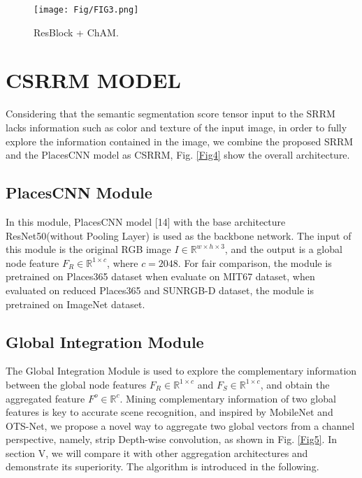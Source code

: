 \documentclass[conference]{IEEEtran}
\begin{document}
\begin{figure}[htbp]
    \centering
    \texttt{[image: Fig/FIG3.png]}
    \caption{ResBlock + ChAM.}
    \label{Fig3}
\end{figure}

\section{CSRRM MODEL}

Considering that the semantic segmentation score tensor input to the SRRM lacks information such as color and texture of the input image, in order to fully explore the information contained in the image, we combine the proposed SRRM and the PlacesCNN model as CSRRM, Fig. \ref{Fig4} show the overall architecture.

\subsection{PlacesCNN Module}

In this module, PlacesCNN model [14] with the base architecture ResNet50\cite{ref14}(without Pooling Layer) is used as the backbone network. The input of this module is the original RGB image $I \in \mathbb{R}^{w \times h \times 3}$, and the output is a global node feature $F_R \in \mathbb{R}^{1 \times c}$, where $c=2048$. For fair comparison, the module is pretrained on Places365 dataset\cite{ref14} when evaluate on MIT67 dataset\cite{ref8}, when evaluated on reduced Places365 and SUNRGB-D\cite{ref30} dataset, the module is pretrained on ImageNet dataset\cite{ref32}.

\subsection{Global Integration Module}

The Global Integration Module is used to explore the complementary information between the global node features $F_R \in \mathbb{R}^{1 \times c}$ and $F_S \in \mathbb{R}^{1 \times c}$, and obtain the aggregated feature $F^o \in \mathbb{R}^c$. Mining complementary information of two global features is key to accurate scene recognition, and inspired by MobileNet\cite{ref25} and OTS-Net\cite{ref16}, we propose a novel way to aggregate two global vectors from a channel perspective, namely, strip Depth-wise convolution, as shown in Fig. \ref{Fig5}. In section V, we will compare it with other aggregation architectures and demonstrate its superiority. The algorithm is introduced in the following.
\end{document}
